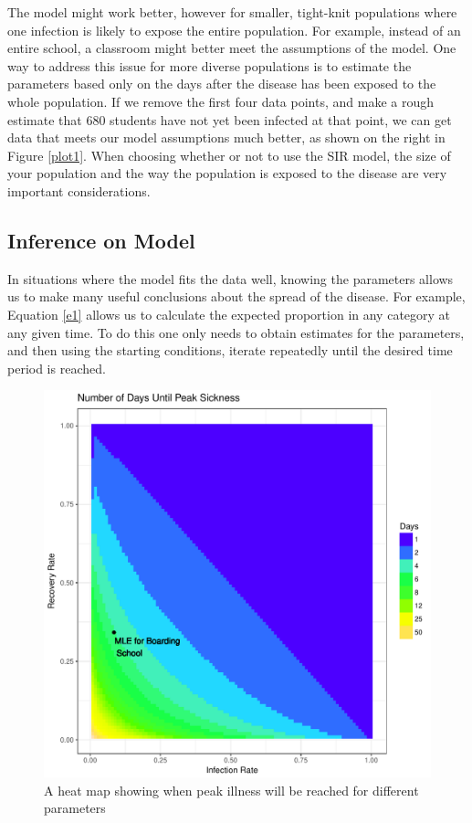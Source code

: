 \documentclass{svproc}
\begin{document}
The model might work better, however for smaller, tight-knit populations where one infection is likely to expose the entire population. For example, instead of an entire school, a classroom might better meet the assumptions of the model. One way to address this issue for more diverse populations is to estimate the parameters based only on the days after the disease has been exposed to the whole population. If we remove the first four data points, and make a rough estimate that 680 students have not yet been infected at that point, we can get data that meets our model assumptions much better, as shown on the right in Figure \ref{plot1}. When choosing whether or not to use the SIR model, the size of your population and the way the population is exposed to the disease are very important considerations.



\subsection*{Inference on Model}

In situations where the model fits the data well, knowing the parameters allows us to make many useful conclusions about the spread of the disease. For example, Equation \eqref{e1} allows us to calculate the expected proportion in any category at any given time. To do this one only needs to obtain estimates for the parameters, and then using the starting conditions, iterate repeatedly until the desired time period is reached. %
\begin{figure}
\centering
\includegraphics[scale=.7]{DayGrid.pdf}
\caption{A heat map showing when peak illness will be reached for different parameters}
\label{plot2}
\end{figure}
\end{document}
